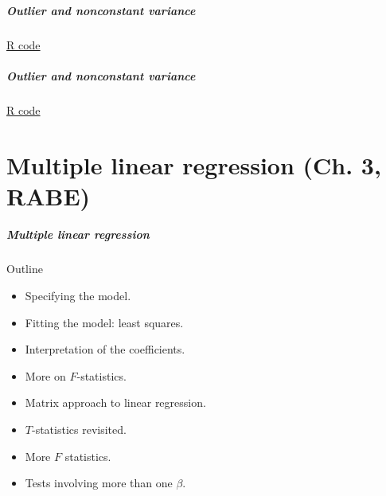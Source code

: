 \documentclass[handout]{beamer}
\begin{document}
   \begin{frame}
   \frametitle{Outlier and nonconstant variance}
   \begin{center}
   \end{center}
   \href{http://stats191.stanford.edu/simple_diagnostics.html#outlier-and-nonconstant-variance}{R code}
   \end{frame}



   \begin{frame}
   \frametitle{Outlier and nonconstant variance}
   \begin{center}
   \end{center}
   \href{http://stats191.stanford.edu/simple_diagnostics.html#outlier-and-nonconstant-variance}{R code}
   \end{frame}

   \part{Multiple linear regression (Ch. 3, RABE)}
   \frame{\partpage}


   \begin{frame} \frametitle{Multiple linear regression}

   \begin{block}
   {Outline}
   \begin{itemize}


   \item Specifying the model.

   \item Fitting the model: least squares.

   \item Interpretation of the coefficients.

   \item More on $F$-statistics.

   \item Matrix approach to linear regression.

   \item $T$-statistics revisited.

   \item More $F$ statistics.

   \item Tests involving more than one $\beta$.

   \end{itemize}
   \end{block}
   \end{frame}
\end{document}
